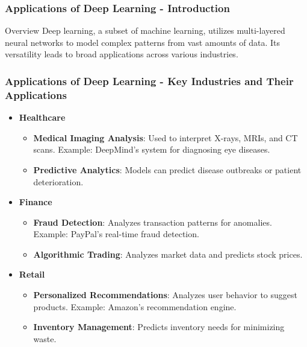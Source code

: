\documentclass[aspectratio=169]{beamer}
\begin{document}
\begin{frame}[fragile]
    \frametitle{Applications of Deep Learning - Introduction}
    \begin{block}{Overview}
        Deep learning, a subset of machine learning, utilizes multi-layered neural networks to model complex patterns from vast amounts of data. Its versatility leads to broad applications across various industries.
    \end{block}
\end{frame}

\begin{frame}[fragile]
    \frametitle{Applications of Deep Learning - Key Industries and Their Applications}
    \begin{itemize}
        \item \textbf{Healthcare}
            \begin{itemize}
                \item \textbf{Medical Imaging Analysis}: Used to interpret X-rays, MRIs, and CT scans. Example: DeepMind's system for diagnosing eye diseases.
                \item \textbf{Predictive Analytics}: Models can predict disease outbreaks or patient deterioration.
            \end{itemize}
        
        \item \textbf{Finance}
            \begin{itemize}
                \item \textbf{Fraud Detection}: Analyzes transaction patterns for anomalies. Example: PayPal's real-time fraud detection.
                \item \textbf{Algorithmic Trading}: Analyzes market data and predicts stock prices.
            \end{itemize}
        
        \item \textbf{Retail}
            \begin{itemize}
                \item \textbf{Personalized Recommendations}: Analyzes user behavior to suggest products. Example: Amazon's recommendation engine.
                \item \textbf{Inventory Management}: Predicts inventory needs for minimizing waste.
            \end{itemize}
    \end{itemize}
\end{frame}
\end{document}
